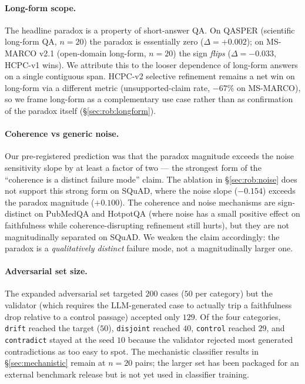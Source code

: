 \paragraph{Long-form scope.}
\label{sec:limitations:longform}
The headline paradox is a property of short-answer QA. On QASPER
(scientific long-form QA, $n=20$) the paradox is essentially zero
($\Delta = +0.002$); on MS-MARCO v2.1 (open-domain long-form, $n=20$)
the sign \emph{flips} ($\Delta = -0.033$, HCPC-v1 wins). We attribute
this to the looser dependence of long-form answers on a single
contiguous span. HCPC-v2 selective refinement remains a net win on
long-form via a different metric (unsupported-claim rate, $-67\%$ on
MS-MARCO), so we frame long-form as a complementary use case rather
than as confirmation of the paradox itself
(\S\ref{sec:rob:longform}).

\paragraph{Coherence vs generic noise.}
\label{sec:limitations:noise}
Our pre-registered prediction was that the paradox magnitude exceeds
the noise sensitivity slope by at least a factor of two — the strongest
form of the ``coherence is a distinct failure mode'' claim. The
ablation in \S\ref{sec:rob:noise} does not support this strong form on
SQuAD, where the noise slope ($-0.154$) exceeds the paradox magnitude
($+0.100$). The coherence and noise mechanisms are sign-distinct on
PubMedQA and HotpotQA (where noise has a small positive effect on
faithfulness while coherence-disrupting refinement still hurts), but
they are not magnitudinally separated on SQuAD. We weaken the claim
accordingly: the paradox is a \emph{qualitatively distinct} failure
mode, not a magnitudinally larger one.

\paragraph{Adversarial set size.}
\label{sec:limitations:adversarial}
The expanded adversarial set targeted $200$ cases ($50$ per category)
but the validator (which requires the LLM-generated case to actually
trip a faithfulness drop relative to a control passage) accepted only
$129$. Of the four categories, \texttt{drift} reached the target
($50$), \texttt{disjoint} reached $40$, \texttt{control} reached $29$,
and \texttt{contradict} stayed at the seed $10$ because the validator
rejected most generated contradictions as too easy to spot. The
mechanistic classifier results in \S\ref{sec:mechanistic} remain at
$n=20$ pairs; the larger set has been packaged for an external
benchmark release but is not yet used in classifier training.

